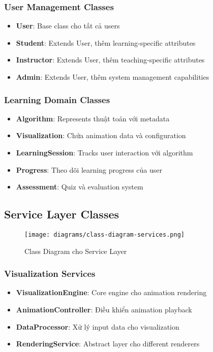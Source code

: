 \subsubsection{User Management Classes}

\begin{itemize}
    \item \textbf{User}: Base class cho tất cả users
    \item \textbf{Student}: Extends User, thêm learning-specific attributes
    \item \textbf{Instructor}: Extends User, thêm teaching-specific attributes  
    \item \textbf{Admin}: Extends User, thêm system management capabilities
\end{itemize}

\subsubsection{Learning Domain Classes}

\begin{itemize}
    \item \textbf{Algorithm}: Represents thuật toán với metadata
    \item \textbf{Visualization}: Chứa animation data và configuration
    \item \textbf{LearningSession}: Tracks user interaction với algorithm
    \item \textbf{Progress}: Theo dõi learning progress của user
    \item \textbf{Assessment}: Quiz và evaluation system
\end{itemize}

\subsection{Service Layer Classes}
\label{subsec:service-classes}

\begin{figure}[H]
\centering
\texttt{[image: diagrams/class-diagram-services.png]}
\caption{Class Diagram cho Service Layer}
\label{fig:class-services}
\end{figure}

\subsubsection{Visualization Services}

\begin{itemize}
    \item \textbf{VisualizationEngine}: Core engine cho animation rendering
    \item \textbf{AnimationController}: Điều khiển animation playback
    \item \textbf{DataProcessor}: Xử lý input data cho visualization
    \item \textbf{RenderingService}: Abstract layer cho different renderers
\end{itemize}

